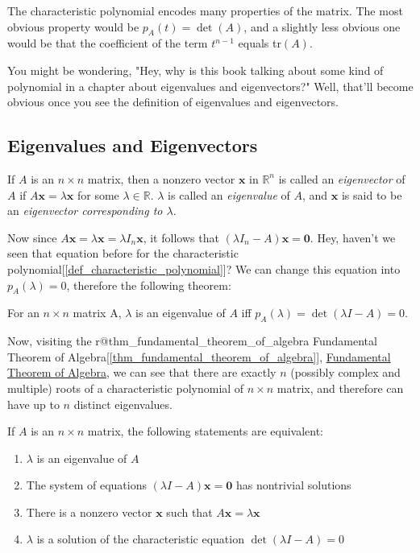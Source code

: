 \documentclass{report}
\begin{document}
			The characteristic polynomial encodes many properties of the matrix. The most obvious property would be $p_A(t)=\det(A)$, and a slightly less obvious one would be that the coefficient of the term $t^{n-1}$ equals tr$(A)$.
			
			You might be wondering, "Hey, why is this book talking about some kind of polynomial in a chapter about eigenvalues and eigenvectors?" Well, that'll become obvious once you see the definition of eigenvalues and eigenvectors.
		
		\subsection{Eigenvalues and Eigenvectors}
		\begin{defn}
			If $A$ is an $n \times n$ matrix, then a nonzero vector $\bm{x}$ in $\mathbb{R}^n$ is called an \emph{eigenvector} of $A$ if $A\bm{x}=\lambda \bm{x}$ for some $\lambda \in \mathbb{R}$. $\lambda$ is called an \emph{eigenvalue} of $A$, and $\bm{x}$ is said to be an \emph{eigenvector corresponding to $\lambda$}.
		\end{defn}
		
		Now since $A\bm{x}=\lambda \bm{x}=\lambda I_n \bm{x}$, it follows that $(\lambda I_n - A)\bm{x}=\bm{0}$. Hey, haven't we seen that equation before for the characteristic polynomial[\ref{def_characteristic_polynomial}]? We can change this equation into $p_A(\lambda)=0$, therefore the following theorem:
		
		\begin{thm}
			For an $n \times n$ matrix A, $\lambda$ is an eigenvalue of $A$ iff $p_A(\lambda)=\det(\lambda I-A)=0$.
		\end{thm}
		
		Now, visiting the
		\ifcsname r@thm_fundamental_theorem_of_algebra \endcsname
		Fundamental Theorem of Algebra[\ref{thm_fundamental_theorem_of_algebra}],
		\else
		\href{https://en.wikipedia.org/wiki/Fundamental_theorem_of_algebra}{Fundamental Theorem of Algebra},
		\fi
		we can see that there are exactly $n$ (possibly complex and multiple) roots of a characteristic polynomial of $n \times n$ matrix, and therefore can have up to $n$ distinct eigenvalues.
		
		\begin{thm}
			If $A$ is an $n \times n$ matrix, the following statements are equivalent:
			\begin{enumerate}
				\item $\lambda$ is an eigenvalue of $A$
				\item The system of equations $(\lambda I-A)\bm{x}=\bm{0}$ has nontrivial solutions
				\item There is a nonzero vector $\bm{x}$ such that $A\bm{x}=\lambda \bm{x}$
				\item $\lambda$ is a solution of the characteristic equation $\det(\lambda I-A)=0$
			\end{enumerate}
		\end{thm}
		
\end{document}
